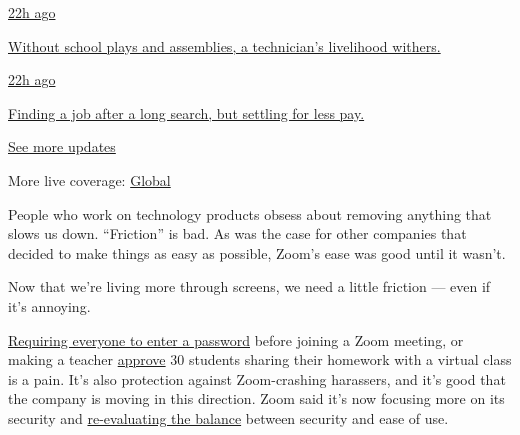\href{https://www.nytimes3xbfgragh.onion/live/2020/08/20/business/stock-market-today-coronavirus?action=click\&pgtype=Article\&state=default\&region=MAIN_CONTENT_1\&context=storylines_live_updates\#without-school-plays-and-assemblies-a-technicians-livelihood-withers}{22h
ago}

\href{https://www.nytimes3xbfgragh.onion/live/2020/08/20/business/stock-market-today-coronavirus?action=click\&pgtype=Article\&state=default\&region=MAIN_CONTENT_1\&context=storylines_live_updates\#without-school-plays-and-assemblies-a-technicians-livelihood-withers}{Without
school plays and assemblies, a technician's livelihood withers.}

\href{https://www.nytimes3xbfgragh.onion/live/2020/08/20/business/stock-market-today-coronavirus?action=click\&pgtype=Article\&state=default\&region=MAIN_CONTENT_1\&context=storylines_live_updates\#finding-a-job-after-a-long-search-but-settling-for-less-pay}{22h
ago}

\href{https://www.nytimes3xbfgragh.onion/live/2020/08/20/business/stock-market-today-coronavirus?action=click\&pgtype=Article\&state=default\&region=MAIN_CONTENT_1\&context=storylines_live_updates\#finding-a-job-after-a-long-search-but-settling-for-less-pay}{Finding
a job after a long search, but settling for less pay.}

\href{https://www.nytimes3xbfgragh.onion/live/2020/08/20/business/stock-market-today-coronavirus?action=click\&pgtype=Article\&state=default\&region=MAIN_CONTENT_1\&context=storylines_live_updates}{See
more updates}

More live coverage:
\href{https://www.nytimes3xbfgragh.onion/2020/08/21/world/covid-19-coronavirus.html?action=click\&pgtype=Article\&state=default\&region=MAIN_CONTENT_1\&context=storylines_live_updates}{Global}

People who work on technology products obsess about removing anything
that slows us down. ``Friction'' is bad. As was the case for other
companies that decided to make things as easy as possible, Zoom's ease
was good until it wasn't.

Now that we're living more through screens, we need a little friction
--- even if it's annoying.

\href{https://support.zoom.us/hc/en-us/articles/360033331271-Account-Setting-Update-Password-Default-for-Meeting-and-Webinar}{Requiring
everyone to enter a password} before joining a Zoom meeting, or making a
teacher
\href{https://blog.zoom.us/wordpress/2020/04/01/a-message-to-our-users/}{approve}
30 students sharing their homework with a virtual class is a pain. It's
also protection against Zoom-crashing harassers, and it's good that the
company is moving in this direction. Zoom said it's now focusing more on
its security and
\href{https://www.bloomberg.com/news/features/2020-04-09/zoom-goes-from-conferencing-app-to-the-pandemic-s-social-network?srnd=premium}{re-evaluating
the balance} between security and ease of use.

